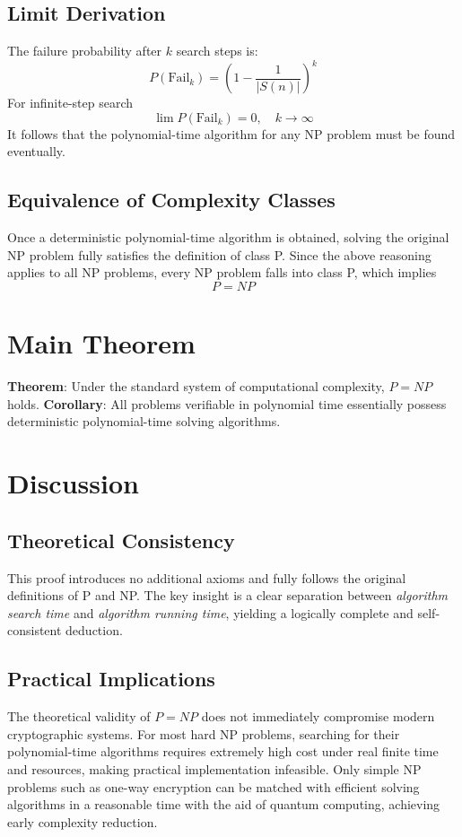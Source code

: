 \documentclass[10pt,a4paper]{article}
\begin{document}
\subsection{Limit Derivation}
The failure probability after $k$ search steps is:
\[
P(\text{Fail}_k)=\left(1-\frac{1}{|S(n)|}\right)^k
\]
For infinite-step search
\[
\lim P(\text{Fail}_k)=0,\quad k\to\infty
\]
It follows that the polynomial-time algorithm for any NP problem must be found eventually.
\subsection{Equivalence of Complexity Classes}
Once a deterministic polynomial-time algorithm is obtained, solving the original NP problem fully satisfies the definition of class P.
Since the above reasoning applies to all NP problems, every NP problem falls into class P, which implies
\[
P=NP
\]
\section{Main Theorem}
\noindent \textbf{Theorem}: Under the standard system of computational complexity, $P=NP$ holds.
\noindent \textbf{Corollary}: All problems verifiable in polynomial time essentially possess deterministic polynomial-time solving algorithms.
\section{Discussion}
\subsection{Theoretical Consistency}
This proof introduces no additional axioms and fully follows the original definitions of P and NP. The key insight is a clear separation between \textit{algorithm search time} and \textit{algorithm running time}, yielding a logically complete and self-consistent deduction.
\subsection{Practical Implications}
The theoretical validity of $P=NP$ does not immediately compromise modern cryptographic systems.
For most hard NP problems, searching for their polynomial-time algorithms requires extremely high cost under real finite time and resources, making practical implementation infeasible.
Only simple NP problems such as one-way encryption can be matched with efficient solving algorithms in a reasonable time with the aid of quantum computing, achieving early complexity reduction.
\end{document}
